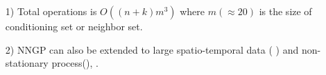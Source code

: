 \documentclass[
12pt, %
a4paper, %
oneside, %
headinclude,footinclude, %
BCOR5mm, %
]{scrartcl}
\begin{document}

\begin{itemize}
 \item [1)] Total operations is $O((n + k)m^3)$ where $m (\approx 20)$ is the size of conditioning set or neighbor set.
 \item [2)] NNGP can also be extended to large spatio-temporal data (
\href{https://chenyw68.github.io/Literature/[2016]Nonseparable dynamic NNGP models for large spatio-temporal data.pdf}{\cite{datta2016nonseparable}}) and non-stationary process(\href{https://chenyw68.github.io/Literature/[2020]Computationally efficient nonstationary nearest-neighborGaussian process models using data-driven techniques.pdf}{\cite{konomi2019computationally}}), \href{https://chenyw68.github.io/Literature/[2020-formal]Bayesian inference for high dimensional nonstationary Gaussian processes.pdf}{\citep{risser2020bayesian}}.
\end{itemize}

%

\end{document}
